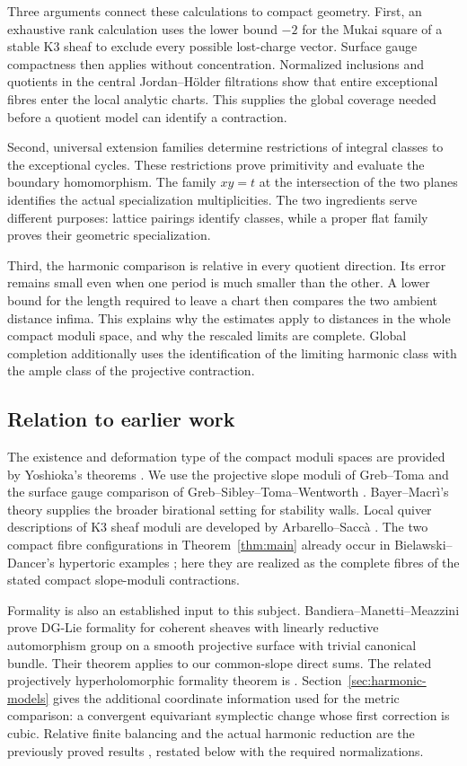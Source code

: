 Three arguments connect these calculations to compact geometry.
First, an exhaustive rank calculation uses the lower bound $-2$ for
the Mukai square of a stable K3 sheaf to exclude every possible
lost-charge vector. Surface gauge compactness then applies without
concentration. Normalized inclusions and quotients in the central
Jordan--H\"older filtrations show that entire exceptional fibres
enter the local analytic charts. This supplies the global coverage
needed before a quotient model can identify a contraction.

Second, universal extension families determine restrictions of
integral classes to the exceptional cycles. These restrictions prove
primitivity and evaluate the boundary homomorphism. The family
$xy=t$ at the intersection of the two planes identifies the actual
specialization multiplicities. The two ingredients serve different
purposes: lattice pairings identify classes, while a proper flat
family proves their geometric specialization.

Third, the harmonic comparison is relative in every quotient
direction. Its error remains small even when one period is much
smaller than the other. A lower bound for the length required to
leave a chart then compares the two ambient distance infima. This
explains why the estimates apply to distances in the whole compact
moduli space, and why the rescaled limits are complete. Global
completion additionally uses the identification of the limiting
harmonic class with the ample class of the projective contraction.

\subsection{Relation to earlier work}
The existence and deformation type of the compact moduli spaces are
provided by Yoshioka's theorems \cite{yoshioka99,yoshioka01}. We use
the projective slope moduli of Greb--Toma \cite{grebtoma} and the
surface gauge comparison of Greb--Sibley--Toma--Wentworth
\cite{gstw}. Bayer--Macr\`i's theory \cite{bayermacri} supplies
the broader birational setting for stability walls. Local quiver
descriptions of K3 sheaf moduli are developed by Arbarello--Sacc\`a
\cite{arbarellosacca}. The two compact fibre configurations in
Theorem~\ref{thm:main} already occur in Bielawski--Dancer's
hypertoric examples \cite[Example~6.10]{bielawskidancer}; here they
are realized as the complete fibres of the stated compact
slope-moduli contractions.

Formality is also an established input to this subject.
Bandiera--Manetti--Meazzini \cite[Theorem~5.1]{bmm} prove DG-Lie
formality for coherent sheaves with linearly reductive automorphism
group on a smooth projective surface with trivial canonical bundle.
Their theorem applies to our common-slope direct sums. The related
projectively hyperholomorphic formality theorem is
\cite[Theorem~4.3]{meazzinionorati}. Section~\ref{sec:harmonic-models}
gives the additional coordinate information used for the metric
comparison: a convergent equivariant symplectic change whose first
correction is cubic. Relative finite balancing and the actual
harmonic reduction are the previously proved results
\cite{wuebben14,wuebben15}, restated below with the required
normalizations.

